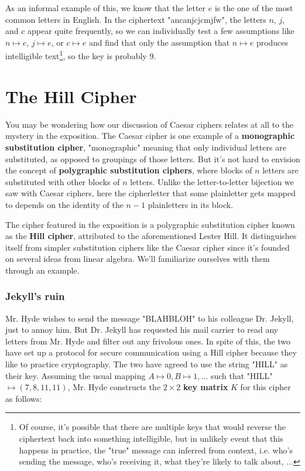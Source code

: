\documentclass{paper}
\begin{document}
\medskip
As an informal example of this, we know that the letter $e$ is the one of the most common letters in English. In the ciphertext "ancanjcjcmjfw", the letters $n$, $j$, and $c$ appear quite frequently, so we can individually test a few assumptions like $n \mapsto e$, $j \mapsto e$, or $c \mapsto e$ and find that only the assumption that $n \mapsto e$ produces intelligible text\footnote{Of course, it's possible that there are multiple keys that would reverse the ciphertext back into something intelligible, but in unlikely event that this happens in practice, the "true" message can inferred from context, i.e. who's sending the message, who's receiving it, what they're likely to talk about, $\dots$}, so the key is probably $9$.

\newpage

\part{The Hill Cipher}

You may be wondering how our discussion of Caesar ciphers relates at all to the mystery in the exposition. The Caesar cipher is one example of a \textbf{monographic substitution cipher}, "monographic" meaning that only individual letters are substituted, as opposed to groupings of those letters. But it's not hard to envision the concept of \textbf{polygraphic substitution ciphers}, where blocks of $n$ letters are substituted with other blocks of $n$ letters. Unlike the letter-to-letter bijection we saw with Caesar ciphers, here the cipherletter that some plainletter gets mapped to depends on the identity of the $n - 1$ plainletters in its block.

\medskip
The cipher featured in the exposition is a polygraphic substitution cipher known as the \textbf{Hill cipher}, attributed to the aforementioned Lester Hill. It distinguishes itself from simpler substitution ciphers like the Caesar cipher since it's founded on several ideas from linear algebra. We'll familiarize ourselves with them through an example.

\section{Jekyll's ruin}

Mr. Hyde wishes to send the message "BLAHBLOH" to his colleague Dr. Jekyll, just to annoy him. But Dr. Jekyll has requested his mail carrier to read any letters from Mr. Hyde and filter out any frivolous ones. In spite of this, the two have set up a protocol for secure communication using a Hill cipher because they like to practice cryptography. The two have agreed to use the string "HILL" as their key. Assuming the usual mapping $A \mapsto 0, B \mapsto 1, \dots$ such that "HILL" $\mapsto (7, 8, 11, 11)$, Mr. Hyde constructs the $2 \times 2$ \textbf{key matrix} $K$ for this cipher as follows:
\end{document}
